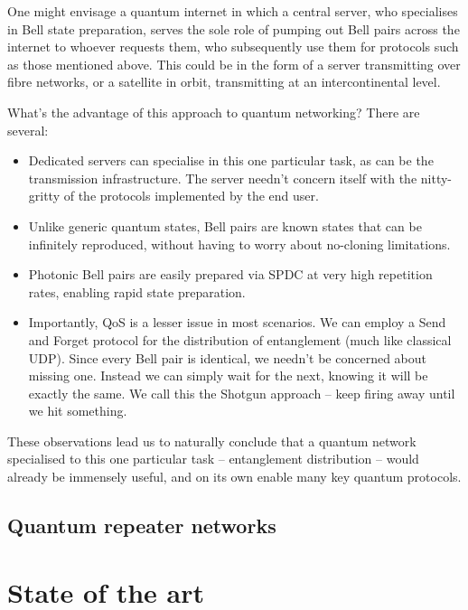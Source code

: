 \documentclass[aps,rmp,twocolumn,amsmath,amssymb,nofootinbib,superscriptaddress,longbibliography,floatfix]{revtex4-1}
\begin{document}
One might envisage a quantum internet in which a central server, who specialises in Bell state preparation, serves the sole role of pumping out Bell pairs across the internet to whoever requests them, who subsequently use them for protocols such as those mentioned above. This could be in the form of a server transmitting over fibre networks, or a satellite in orbit, transmitting at an intercontinental level.

What's the advantage of this approach to quantum networking? There are several:
\begin{itemize}
\item Dedicated servers can specialise in this one particular task, as can be the transmission infrastructure. The server needn't concern itself with the nitty-gritty of the protocols implemented by the end user.
\item Unlike generic quantum states, Bell pairs are known states that can be infinitely reproduced, without having to worry about no-cloning limitations.
\item Photonic Bell pairs are easily prepared via SPDC at very high repetition rates, enabling rapid state preparation.
\item Importantly, QoS is a lesser issue in most scenarios. We can employ a {\sc Send and Forget} protocol for the distribution of entanglement (much like classical UDP). Since every Bell pair is identical, we needn't be concerned about missing one. Instead we can simply wait for the next, knowing it will be exactly the same. We call this the {\sc Shotgun} approach -- keep firing away until we hit something.
\end{itemize}

These observations lead us to naturally conclude that a quantum network specialised to this one particular task -- entanglement distribution -- would already be immensely useful, and on its own enable many key quantum protocols.

%
%

\subsection{Quantum repeater networks}

\cite{bib:DurBriegel999}

%
%

\section{State of the art}
\end{document}
